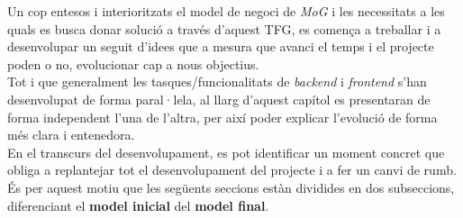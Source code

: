 \label{desenvolupament}
Un cop entesos i interioritzats el model de negoci de \textit{MoG} i les necessitats a les quals es busca donar solució a través d'aquest TFG, es comença a treballar i a desenvolupar un seguit d'idees que a mesura que avanci el temps i el projecte poden o no, evolucionar cap a nous objectius.\\
\newline Tot i que generalment les tasques/funcionalitats de \textit{backend} i \textit{frontend} s'han desenvolupat de forma paral·lela, al llarg d'aquest capítol es presentaran de forma independent l'una de l'altra, per així poder explicar l'evolució de forma més clara i entenedora.\\
\newline En el transcurs del desenvolupament, es pot identificar un moment concret que obliga a replantejar tot el desenvolupament del projecte i a fer un canvi de rumb. És per aquest motiu que les següents seccions estàn dividides en dos subseccions, diferenciant el \textbf{model inicial} del \textbf{model final}.

\clearpage

\clearpage